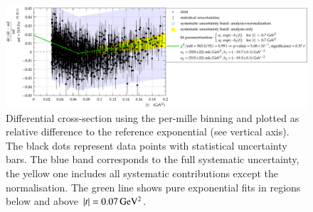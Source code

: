 \begin{figure}
\begin{center}
\includegraphics[width=\textwidth]{fig/t_dist_rel_with_split_fit.pdf}
\vskip-4mm
\caption{%
Differential cross-section using the per-mille binning and plotted as relative difference to the reference exponential (see vertical axis). The black dots represent data points with statistical uncertainty bars. The blue band corresponds to the full systematic uncertainty, the yellow one includes all systematic contributions except the normalisation. The green line shows pure exponential fits in regions below and above $|t| = 0.07\,{\rm GeV^2}$.
}
\label{fig:data rel cpb0.001}
\end{center}
\end{figure}



